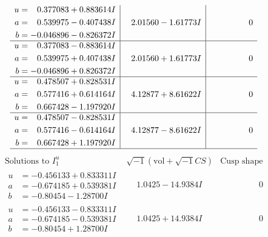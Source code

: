 \documentclass[1p]{elsarticle_modified}
\theoremstyle{definition}
\newcommand{\I}{\sqrt{-1}}
\begin{document}
$$\begin{array}{c|c|c}
\begin{aligned}
u &= \phantom{-}0.377083 + 0.883614 I \\
a &= \phantom{-}0.539975 - 0.407438 I \\
b &= -0.046896 - 0.826372 I\end{aligned}
 & \phantom{-}2.01560 - 1.61773 I & \phantom{-0.000000 } 0 \\ \hline\begin{aligned}
u &= \phantom{-}0.377083 - 0.883614 I \\
a &= \phantom{-}0.539975 + 0.407438 I \\
b &= -0.046896 + 0.826372 I\end{aligned}
 & \phantom{-}2.01560 + 1.61773 I & \phantom{-0.000000 } 0 \\ \hline\begin{aligned}
u &= \phantom{-}0.478507 + 0.828531 I \\
a &= \phantom{-}0.577416 + 0.614164 I \\
b &= \phantom{-}0.667428 - 1.197920 I\end{aligned}
 & \phantom{-}4.12877 + 8.61622 I & \phantom{-0.000000 } 0 \\ \hline\begin{aligned}
u &= \phantom{-}0.478507 - 0.828531 I \\
a &= \phantom{-}0.577416 - 0.614164 I \\
b &= \phantom{-}0.667428 + 1.197920 I\end{aligned}
 & \phantom{-}4.12877 - 8.61622 I & \phantom{-0.000000 } 0\\
 \hline 
 \end{array}$$\newpage$$\begin{array}{c|c|c}  
\text{Solutions to }I^u_{1}& \I (\text{vol} + \sqrt{-1}CS) & \text{Cusp shape}\\
 \hline 
\begin{aligned}
u &= -0.456133 + 0.833311 I \\
a &= -0.674185 + 0.539381 I \\
b &= -0.80454 - 1.28700 I\end{aligned}
 & \phantom{-}1.0425 - 14.9384 I & \phantom{-0.000000 } 0 \\ \hline\begin{aligned}
u &= -0.456133 - 0.833311 I \\
a &= -0.674185 - 0.539381 I \\
b &= -0.80454 + 1.28700 I\end{aligned}
 & \phantom{-}1.0425 + 14.9384 I & \phantom{-0.000000 } 0 \\ \hline\begin{aligned}

\end{aligned}
\end{array}$$
\end{document}
